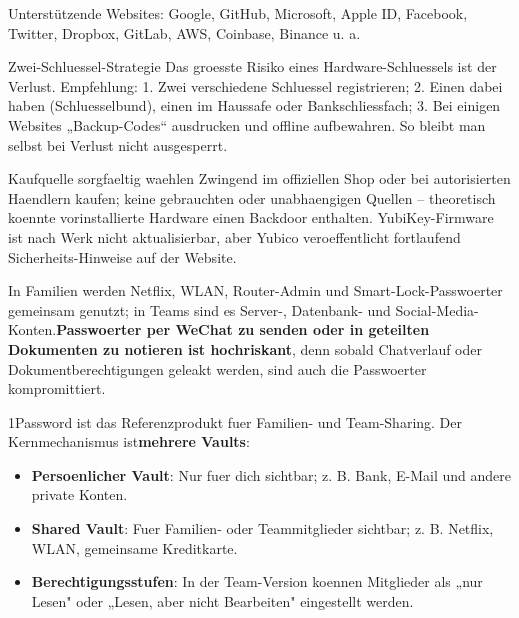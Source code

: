 Unterstützende Websites: Google, GitHub, Microsoft, Apple ID, Facebook, Twitter, Dropbox, GitLab, AWS, Coinbase, Binance u. a.

\begin{tcbinfo}{Zwei-Schluessel-Strategie}
Das groesste Risiko eines Hardware-Schluessels ist der Verlust. Empfehlung: 1. Zwei verschiedene Schluessel registrieren; 2. Einen dabei haben (Schluesselbund), einen im Haussafe oder Bankschliessfach; 3. Bei einigen Websites „Backup-Codes“ ausdrucken und offline aufbewahren. So bleibt man selbst bei Verlust nicht ausgesperrt.

\end{tcbinfo}

\begin{tcbwarn}{Kaufquelle sorgfaeltig waehlen}
Zwingend im offiziellen Shop oder bei autorisierten Haendlern kaufen; keine gebrauchten oder unabhaengigen Quellen – theoretisch koennte vorinstallierte Hardware einen Backdoor enthalten. YubiKey-Firmware ist nach Werk nicht aktualisierbar, aber Yubico veroeffentlicht fortlaufend Sicherheits-Hinweise auf der Website.

\end{tcbwarn}


In Familien werden Netflix, WLAN, Router-Admin und Smart-Lock-Passwoerter gemeinsam genutzt; in Teams sind es Server-, Datenbank- und Social-Media-Konten.\textbf{Passwoerter per WeChat zu senden oder in geteilten Dokumenten zu notieren ist hochriskant}, denn sobald Chatverlauf oder Dokumentberechtigungen geleakt werden, sind auch die Passwoerter kompromittiert.


1Password ist das Referenzprodukt fuer Familien- und Team-Sharing. Der Kernmechanismus ist\textbf{mehrere Vaults}:

\begin{itemize}
  \item \textbf{Persoenlicher Vault}: Nur fuer dich sichtbar; z. B. Bank, E-Mail und andere private Konten.
  \item \textbf{Shared Vault}: Fuer Familien- oder Teammitglieder sichtbar; z. B. Netflix, WLAN, gemeinsame Kreditkarte.
  \item \textbf{Berechtigungsstufen}: In der Team-Version koennen Mitglieder als „nur Lesen" oder „Lesen, aber nicht Bearbeiten" eingestellt werden.
\end{itemize}


